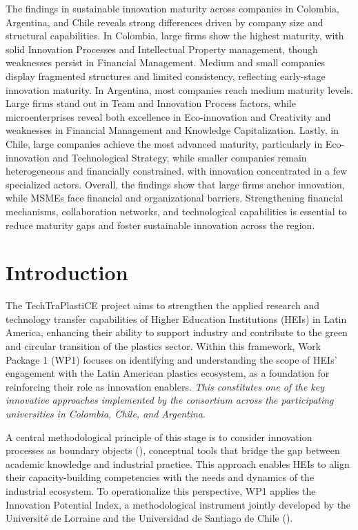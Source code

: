 \documentclass[
  12pt,
  oneside]{book}
\begin{document}
The findings in sustainable innovation maturity across companies in
Colombia, Argentina, and Chile reveals strong differences driven by
company size and structural capabilities. In Colombia, large firms show
the highest maturity, with solid Innovation Processes and Intellectual
Property management, though weaknesses persist in Financial Management.
Medium and small companies display fragmented structures and limited
consistency, reflecting early-stage innovation maturity. In Argentina,
most companies reach medium maturity levels. Large firms stand out in
Team and Innovation Process factors, while microenterprises reveal both
excellence in Eco-innovation and Creativity and weaknesses in Financial
Management and Knowledge Capitalization. Lastly, in Chile, large
companies achieve the most advanced maturity, particularly in
Eco-innovation and Technological Strategy, while smaller companies
remain heterogeneous and financially constrained, with innovation
concentrated in a few specialized actors. Overall, the findings show
that large firms anchor innovation, while MSMEs face financial and
organizational barriers. Strengthening financial mechanisms,
collaboration networks, and technological capabilities is essential to
reduce maturity gaps and foster sustainable innovation across the
region.

\chapter{Introduction}\label{introduction}

The TechTraPlastiCE project aims to strengthen the applied research and
technology transfer capabilities of Higher Education Institutions (HEIs)
in Latin America, enhancing their ability to support industry and
contribute to the green and circular transition of the plastics sector.
Within this framework, Work Package 1 (WP1) focuses on identifying and
understanding the scope of HEIs' engagement with the Latin American
plastics ecosystem, as a foundation for reinforcing their role as
innovation enablers. \emph{This constitutes one of the key innovative
approaches implemented by the consortium across the participating
universities in Colombia, Chile, and Argentina}.

A central methodological principle of this stage is to consider
innovation processes as boundary objects
(), conceptual tools
that bridge the gap between academic knowledge and industrial practice.
This approach enables HEIs to align their capacity-building competencies
with the needs and dynamics of the industrial ecosystem. To
operationalize this perspective, WP1 applies the Innovation Potential
Index, a methodological instrument jointly developed by the Université
de Lorraine and the Universidad de Santiago de Chile
().
\end{document}
